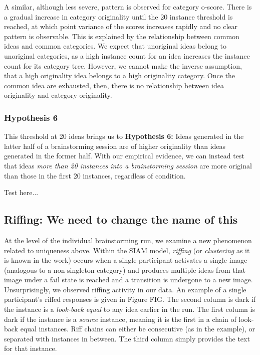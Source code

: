 A similar, although less severe, pattern is observed for category o-score. There is a gradual increase in category originality until the 20 instance threshold is reached, at which point variance of the scores increases rapidly and no clear pattern is observable. This is explained by the relationship between common ideas and common categories. We expect that unoriginal ideas belong to unoriginal categories, as a high instance count for an idea increases the instance count for its category tree. However, we cannot make the inverse assumption, that a high originality idea belongs to a high originality category. Once the common idea are exhausted, then, there is no relationship between idea originality and category originality.

\subsubsection{Hypothesis 6}

This threshold at 20 ideas brings us to \textbf{Hypothesis 6:} Ideas generated in the latter half of a brainstorming session are of higher originality than ideas generated in the former half. With our empirical evidence, we can instead test that ideas \emph{more than 20 instances into a brainstorming session} are more original than those in the first 20 instances, regardless of condition.

Test here...

\subsection{Riffing: We need to change the name of this}

At the level of the individual brainstorming run, we examine a new phenomenon related to uniqueness above. Within the SIAM model, \emph{riffing} (or \emph{clustering} as it is known in the work) occurs when a single participant activates a single image (analogous to a non-singleton category) and produces multiple ideas from that image under a fail state is reached and a transition is undergone to a new image. Unsurprisingly, we observed riffing activity in our data. An example of a single participant's riffed responses is given in Figure FIG. The second column is dark if the instance is a \emph{look-back equal} to any idea earlier in the run. The first column is dark if the instance is a \emph{source} instance, meaning it is the first in a chain of look-back equal instances. Riff chains can either be consecutive (as in the example), or separated with instances in between. The third column simply provides the text for that instance.

